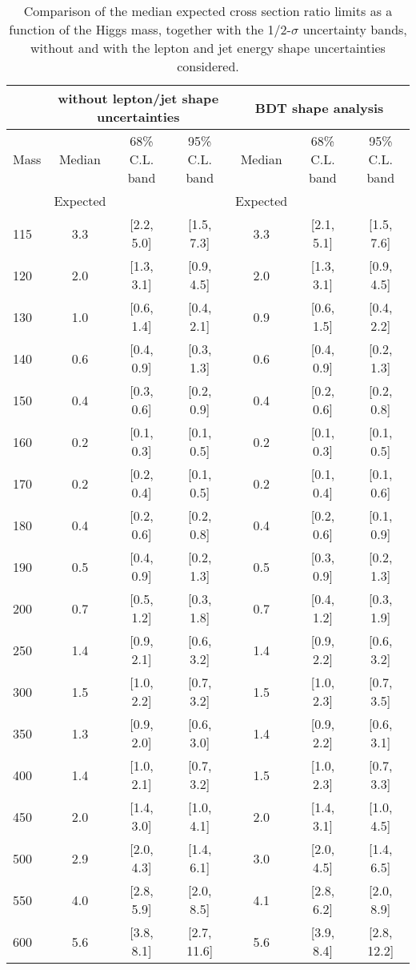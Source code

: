 \begin{table}[!ht]
\begin{center}
{\normalsize
\begin{tabular}{|l|c|c|c|c|c|c|}
\hline
      &  \multicolumn{3}{c|}{without lepton/jet shape uncertainties} &\multicolumn{3}{c|}{BDT shape analysis} \\
\hline
Mass  &  Median      &     68\% C.L. band &  95\% C.L. band &  Median	   &	 68\% C.L. band &  95\% C.L. band\\
      &  Expected    &                    &                 &  Expected    &			&		 \\
\hline
115 &  3.3 & [2.2, 5.0] & [1.5, 7.3]  &  3.3 & [2.1, 5.1] & [1.5, 7.6] \\
120 &  2.0 & [1.3, 3.1] & [0.9, 4.5]  &  2.0 & [1.3, 3.1] & [0.9, 4.5] \\
130 &  1.0 & [0.6, 1.4] & [0.4, 2.1]  &  0.9 & [0.6, 1.5] & [0.4, 2.2] \\
140 &  0.6 & [0.4, 0.9] & [0.3, 1.3]  &  0.6 & [0.4, 0.9] & [0.2, 1.3] \\
150 &  0.4 & [0.3, 0.6] & [0.2, 0.9]  &  0.4 & [0.2, 0.6] & [0.2, 0.8] \\
160 &  0.2 & [0.1, 0.3] & [0.1, 0.5]  &  0.2 & [0.1, 0.3] & [0.1, 0.5] \\
170 &  0.2 & [0.2, 0.4] & [0.1, 0.5]  &  0.2 & [0.1, 0.4] & [0.1, 0.6] \\
180 &  0.4 & [0.2, 0.6] & [0.2, 0.8]  &  0.4 & [0.2, 0.6] & [0.1, 0.9] \\
190 &  0.5 & [0.4, 0.9] & [0.2, 1.3]  &  0.5 & [0.3, 0.9] & [0.2, 1.3] \\
200 &  0.7 & [0.5, 1.2] & [0.3, 1.8]  &  0.7 & [0.4, 1.2] & [0.3, 1.9] \\
250 &  1.4 & [0.9, 2.1] & [0.6, 3.2]  &  1.4 & [0.9, 2.2] & [0.6, 3.2] \\
300 &  1.5 & [1.0, 2.2] & [0.7, 3.2]  &  1.5 & [1.0, 2.3] & [0.7, 3.5] \\
350 &  1.3 & [0.9, 2.0] & [0.6, 3.0]  &  1.4 & [0.9, 2.2] & [0.6, 3.1] \\
400 &  1.4 & [1.0, 2.1] & [0.7, 3.2]  &  1.5 & [1.0, 2.3] & [0.7, 3.3] \\
450 &  2.0 & [1.4, 3.0] & [1.0, 4.1]  &  2.0 & [1.4, 3.1] & [1.0, 4.5] \\
500 &  2.9 & [2.0, 4.3] & [1.4, 6.1]  &  3.0 & [2.0, 4.5] & [1.4, 6.5] \\
550 &  4.0 & [2.8, 5.9] & [2.0, 8.5]  &  4.1 & [2.8, 6.2] & [2.0, 8.9] \\
600 &  5.6 & [3.8, 8.1] & [2.7, 11.6] &  5.6 & [3.9, 8.4] & [2.8, 12.2]\\
\hline
\end{tabular}
}
\caption{Comparison of the median expected cross section ratio limits as a function 
of the Higgs mass, together with the 1/2-$\sigma$ uncertainty bands, without and with the 
lepton and jet energy shape uncertainties considered.}
\label{tab:mva_shapewithwithoutlepjes}
\end{center}
\end{table}

